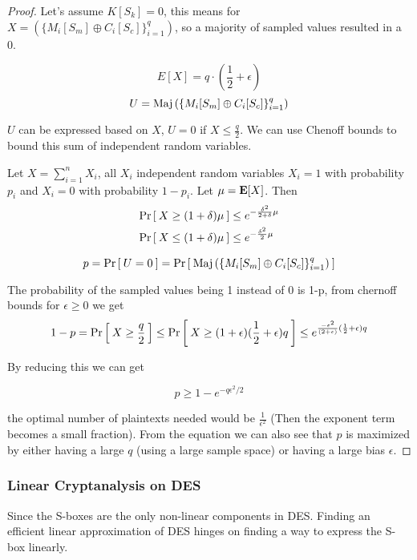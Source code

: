 \begin{proof}
	Let's assume \(K[S_k] = 0\), this means for \(X = \left(\{M_i[S_m]\oplus C_i[S_c]\}_{i=1}^q\right)\), so a majority of sampled values resulted in a 0. \newline

	 \[ E[X] = q\cdot(\frac{1}{2} + \epsilon) \]
	\[ U = \textnormal{Maj}\left(\{M_i[S_m]\oplus C_i[S_c]\}_{i=1}^q\right) \] 


    $U$ can be expressed based on $X$, $U = 0$ if $ X \le \frac{q}{2}$. We can use Chenoff bounds to bound this sum of independent random variables.\newline
	\begin{theorem}
	Let $X = \sum_{i=1}^n X_i$, all $X_i$ independent random variables $X_i = 1$ with probability $p_i$ and $X_i = 0$
	with probability $1-p_i$. Let $\mu = {\textbf E}[X]$. Then  
	\begin{align}
  	\Pr\left[\: X \ge (1 + \delta)\mu \:\right] &\le e^{-\frac{\delta^2}{2+\delta}\mu}\\
  	\Pr\left[\: X \le (1 + \delta)\mu \:\right] &\le e^{-\frac{\delta^2}{2}\mu}
	\end{align}
	\end{theorem}

	\[ p = \Pr\left[\: U = 0 \:\right] = \Pr\left[\: \textnormal{Maj}\left(\{M_i[S_m]\oplus C_i[S_c]\}_{i=1}^q\right) \:\right] \]

	The probability of the sampled values being 1 instead of 0 is 1-p, from chernoff bounds for \( \epsilon \geq 0 \) we get
	\[ 1 - p = \Pr\left[\: X \geq \frac{q}{2} \:\right] \leq \Pr\left[\: X \geq (1+ \epsilon)(\frac{1}{2} + \epsilon)q \:\right] \leq e^{\frac{-\epsilon^2}{(2 + \epsilon)}(\frac{1}{2} + \epsilon)q}\] 

	By reducing this we can get

	\[ p \geq 1 - e^{-q\epsilon^2/2} \]

	the optimal number of plaintexts needed would be \( \frac{1}{\epsilon^2}\) (Then the exponent term becomes a small fraction). From the equation we can also see that $p$ is maximized by either having a large $q$ (using a large sample space) or having a large bias $\epsilon$.
\end{proof}

\subsubsection*{Linear Cryptanalysis on DES} Since the S-boxes are the only non-linear components in DES. Finding an efficient linear approximation
of DES hinges on finding a way to express the S-box linearly. \newline


